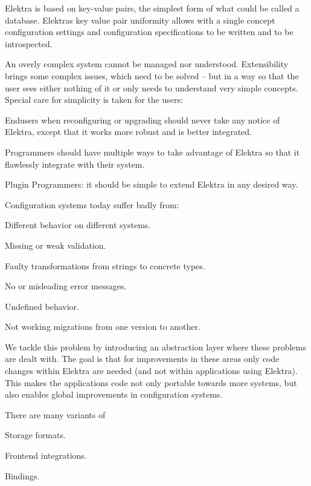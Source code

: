 Elektra is based on key-\/value pairs, the simplest form of what could be called a database. Elektra\textquotesingle{}s key value pair uniformity allows with a single concept configuration settings and configuration specifications to be written and to be introspected.

An overly complex system cannot be managed nor understood. Extensibility brings some complex issues, which need to be solved -- but in a way so that the user sees either nothing of it or only needs to understand very simple concepts. Special care for simplicity is taken for the users\+:


\begin{DoxyItemize}
\item Endusers when reconfiguring or upgrading should never take any notice of Elektra, except that it works more robust and is better integrated.
\item Programmers should have multiple ways to take advantage of Elektra so that it flawlessly integrate with their system.
\item Plugin Programmers\+: it should be simple to extend Elektra in any desired way.
\end{DoxyItemize}

Configuration systems today suffer badly from\+:


\begin{DoxyItemize}
\item Different behavior on different systems.
\item Missing or weak validation.
\item Faulty transformations from strings to concrete types.
\item No or misleading error messages.
\item Undefined behavior.
\item Not working migrations from one version to another.
\end{DoxyItemize}

We tackle this problem by introducing an abstraction layer where these problems are dealt with. The goal is that for improvements in these areas only code changes within Elektra are needed (and not within applications using Elektra). This makes the application\textquotesingle{}s code not only portable towards more systems, but also enables global improvements in configuration systems.

There are many variants of


\begin{DoxyItemize}
\item Storage formats.
\item Frontend integrations.
\item Bindings.
\end{DoxyItemize}

